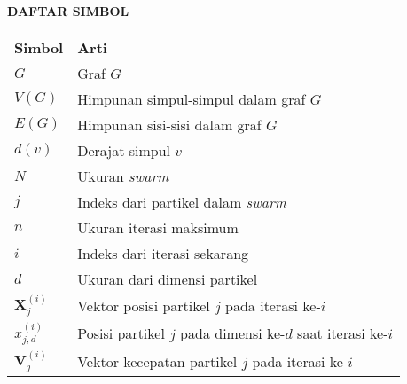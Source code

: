 \frenchspacing
\begin{center}
    \textbf{DAFTAR SIMBOL}
\end{center}
\vspace{3mm}

\hspace{-0.1cm}
\begin{tabular}{lp{}}
    \textbf{Simbol} \qquad \qquad   & \textbf{Arti}                                                                        \\

    $G$                             & Graf $G$                                                                             \\
    $V(G)$                          & Himpunan simpul-simpul dalam graf $G$                                                \\
    $E(G)$                          & Himpunan sisi-sisi dalam graf $G$                                                    \\
    $d(v)$                          & Derajat simpul $v$                                                                   \\
    $N$                             & Ukuran \textit{swarm}                                                                \\
    $j$                             & Indeks dari partikel dalam \textit{swarm}                                            \\
    $n$                             & Ukuran iterasi maksimum                                                              \\
    $i$                             & Indeks dari iterasi sekarang                                                         \\
    $d$                             & Ukuran dari dimensi partikel                                                         \\
    $\boldsymbol{X}_{j}^{(i)}$      & Vektor posisi partikel $j$ pada iterasi ke-$i$                                       \\
    $x_{j,d}^{(i)}$                 & Posisi partikel $j$ pada dimensi ke-$d$ saat iterasi ke-$i$                          \\
    $\boldsymbol{V}_{j}^{(i)}$      & Vektor kecepatan partikel $j$ pada iterasi ke-$i$                                    \\

\end{tabular}
